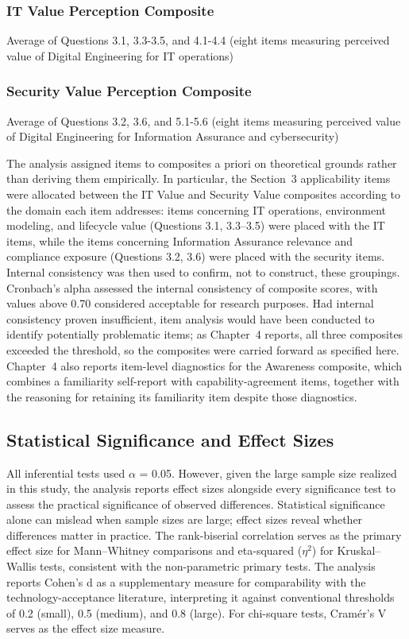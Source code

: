 \subsubsection{IT Value Perception Composite}

Average of Questions 3.1, 3.3-3.5, and 4.1-4.4 (eight items measuring perceived value of Digital Engineering for IT operations)

\subsubsection{Security Value Perception Composite}

Average of Questions 3.2, 3.6, and 5.1-5.6 (eight items measuring perceived value of Digital Engineering for Information Assurance and cybersecurity)

The analysis assigned items to composites a priori on theoretical grounds rather than deriving them empirically. In particular, the Section~3 applicability items were allocated between the IT Value and Security Value composites according to the domain each item addresses: items concerning IT operations, environment modeling, and lifecycle value (Questions 3.1, 3.3--3.5) were placed with the IT items, while the items concerning Information Assurance relevance and compliance exposure (Questions 3.2, 3.6) were placed with the security items. Internal consistency was then used to confirm, not to construct, these groupings. Cronbach's alpha assessed the internal consistency of composite scores, with values above 0.70 considered acceptable for research purposes. Had internal consistency proven insufficient, item analysis would have been conducted to identify potentially problematic items; as Chapter~4 reports, all three composites exceeded the threshold, so the composites were carried forward as specified here. Chapter~4 also reports item-level diagnostics for the Awareness composite, which combines a familiarity self-report with capability-agreement items, together with the reasoning for retaining its familiarity item despite those diagnostics.

\subsection{Statistical Significance and Effect Sizes}

All inferential tests used \(\alpha\) = 0.05. However, given the large sample size realized in this study, the analysis reports effect sizes alongside every significance test to assess the practical significance of observed differences. Statistical significance alone can mislead when sample sizes are large; effect sizes reveal whether differences matter in practice. The rank-biserial correlation serves as the primary effect size for Mann--Whitney comparisons and eta-squared (\(\eta^2\)) for Kruskal--Wallis tests, consistent with the non-parametric primary tests. The analysis reports Cohen's d as a supplementary measure for comparability with the technology-acceptance literature, interpreting it against conventional thresholds of 0.2 (small), 0.5 (medium), and 0.8 (large). For chi-square tests, Cram\'{e}r's V serves as the effect size measure.

